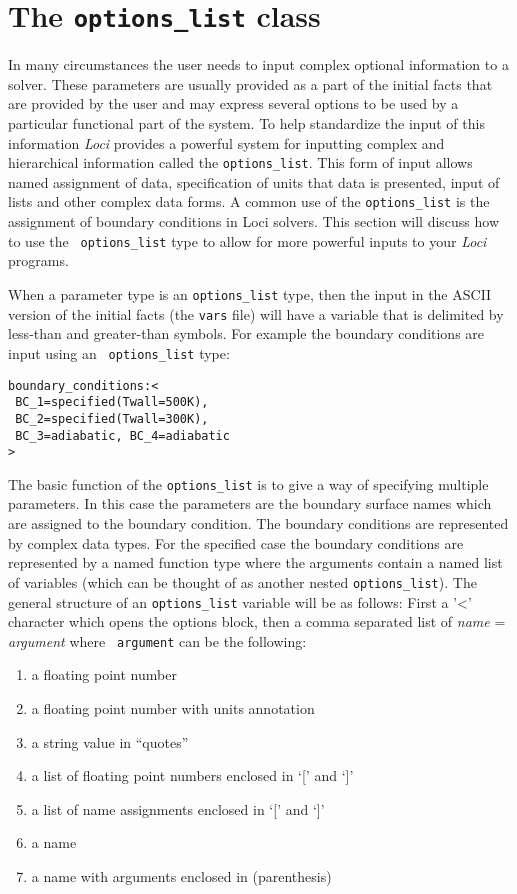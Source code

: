 \section{The {\tt options\_list} class}

In many circumstances the user needs to input complex optional
information to a solver.  These parameters are usually provided as a
part of the initial facts that are provided by the user and may express
several options to be used by a particular functional part of the
system.  To help standardize the input of this information {\it Loci}
provides a powerful system for inputting complex and hierarchical
information called the {\tt options\_list}.  This form of input allows
named assignment of data, specification of units that data is
presented, input of lists and other complex data forms.  A common use
of the {\tt options\_list} is the assignment of boundary conditions in
Loci solvers.  This section will discuss how to use the {\tt
  options\_list} type to allow for more powerful inputs to your {\it
  Loci} programs.

When a parameter type is an {\tt options\_list} type, then the input
in the ASCII version of the initial facts (the {\tt vars} file) will
have a variable that is delimited by less-than and greater-than
symbols.  For example the boundary conditions are input using an {\tt
  options\_list} type:
\begin{verbatim}
boundary_conditions:<
 BC_1=specified(Twall=500K), 
 BC_2=specified(Twall=300K),
 BC_3=adiabatic, BC_4=adiabatic  
>
\end{verbatim}
The basic function of the {\tt options\_list} is to give a way of
specifying multiple parameters.  In this case the parameters are the
boundary surface names which are assigned to the boundary condition.
The boundary conditions are represented by complex data types. For the
specified case the boundary conditions are represented by a named
function type where the arguments contain a named list of variables
(which can be thought of as another nested {\tt options\_list}).  The
general structure of an {\tt options\_list} variable will be as
follows:  First a '<' character which opens the options block, then a
comma separated list of {\it name} = {\it argument} where {\tt
  argument} can be the following:
\begin{enumerate}
  \item a floating point number
  \item a floating point number with units annotation
  \item a string value in ``quotes''
  \item a list of floating point numbers enclosed in `[' and `]'
  \item a list of name assignments enclosed in `[' and `]'
  \item a name
  \item a name with arguments enclosed in (parenthesis)
\end{enumerate}


